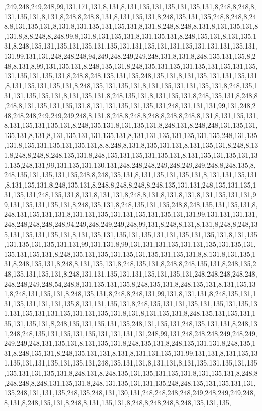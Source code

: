 ,249,248,249,248,99,131,171,131,8,131,8,131,135,131,135,131,135,131,8,248,8,248,8,131,135,131,8,131,8,248,8,248,8,131,8,131,135,131,8,248,135,131,135,248,8,248,8,248,8,131,135,131,8,131,8,131,135,131,135,131,8,131,8,248,8,248,8,131,8,131,135,131,8,131,8,8,8,248,8,248,99,8,131,8,131,135,131,8,131,135,131,8,248,135,131,8,131,135,131,8,248,135,131,135,131,135,131,135,131,131,135,131,131,135,131,131,131,135,131,131,99,131,131,248,248,248,94,249,248,249,249,248,131,8,131,8,248,135,131,135,8,248,8,131,8,99,131,135,131,8,248,135,131,8,248,135,131,135,131,135,131,135,131,135,131,135,131,135,131,8,248,8,248,135,131,135,248,135,131,8,131,135,131,131,135,131,8,131,135,131,135,131,8,248,135,131,135,131,8,131,135,131,131,135,131,8,248,135,131,131,135,135,131,8,131,135,131,8,248,135,131,8,131,135,131,8,248,135,131,8,248,8,248,8,131,135,131,135,131,8,131,131,135,131,135,131,248,131,131,131,99,131,248,248,248,248,249,249,249,248,8,131,8,248,8,248,8,248,8,248,8,248,8,131,8,131,135,131,8,131,135,131,135,131,8,248,135,131,8,131,135,131,8,248,131,8,248,248,131,135,131,135,131,8,131,8,131,135,131,131,135,131,8,131,131,135,131,135,131,135,248,131,135,131,8,135,131,135,131,135,131,8,8,248,8,131,8,135,131,131,8,131,135,131,8,248,8,131,8,248,8,248,8,248,135,131,8,248,135,131,135,131,135,131,8,131,135,131,135,131,131,135,248,131,99,131,135,131,130,131,248,248,248,249,248,249,249,248,8,248,135,8,248,135,131,135,131,135,248,8,248,135,131,8,131,135,131,135,131,8,131,131,135,131,8,131,135,131,8,248,135,131,8,248,8,248,8,248,8,248,135,131,131,248,135,131,135,131,135,131,248,135,131,8,131,8,131,131,8,248,8,131,8,131,8,131,8,131,135,131,131,99,131,135,131,135,131,8,248,135,131,8,248,135,131,135,248,8,248,135,131,135,131,8,248,131,135,131,131,8,131,131,135,131,131,135,131,135,131,131,99,131,131,131,131,248,248,248,248,248,94,249,248,249,249,248,99,131,8,248,8,131,8,131,8,248,8,248,135,131,135,131,135,131,8,131,135,131,135,131,135,131,131,135,131,135,131,8,131,135,131,135,131,135,131,131,99,131,131,8,99,131,131,131,135,131,131,135,131,135,131,135,131,135,131,8,248,135,131,135,131,135,131,135,131,135,131,8,8,131,8,131,135,131,8,248,135,131,8,248,8,131,135,131,8,248,135,131,8,248,8,248,135,131,8,248,135,248,135,131,135,131,8,248,131,131,135,131,131,135,131,135,131,248,248,248,248,248,248,248,249,248,54,248,8,131,135,131,135,8,248,135,131,8,248,135,131,8,131,135,131,8,248,131,135,131,8,248,135,131,8,248,8,248,131,99,131,8,131,131,8,248,135,131,131,135,131,131,131,135,8,131,131,135,131,8,248,135,131,131,135,131,135,131,135,131,131,135,131,131,135,131,131,135,131,8,131,8,131,135,131,8,248,135,131,135,131,135,131,135,131,8,248,135,131,135,131,135,248,131,135,131,248,135,131,131,8,248,131,248,248,135,131,135,131,135,131,131,131,131,248,99,131,248,248,248,249,248,249,249,249,248,131,135,131,8,131,135,131,8,248,135,131,8,248,135,131,131,8,248,135,131,8,248,135,131,8,248,135,131,131,8,131,8,131,131,135,131,99,131,131,8,131,135,131,135,131,131,135,131,135,131,248,135,131,131,8,131,131,8,131,135,131,135,131,135,135,131,131,135,131,8,248,131,8,248,135,131,135,131,135,131,8,131,135,131,8,248,8,248,248,8,248,131,135,131,8,248,131,135,131,131,135,248,248,135,131,135,131,131,135,248,131,131,135,248,135,248,131,130,131,248,248,248,248,249,248,249,249,248,8,131,8,248,135,131,8,248,8,131,135,131,8,248,8,248,248,8,248,135,131,135,
